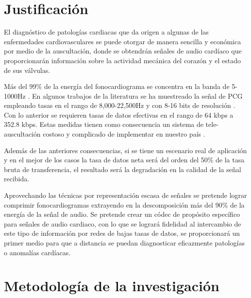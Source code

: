 \section{Justificación}
El diagnóstico de patologías cardiacas que da origen a algunas de las enfermedades cardiovasculares se puede otorgar de manera sencilla y económica por medio de la auscultación, donde se obtendrán señales de audio cardíaco que proporcionarán información sobre la actividad mecánica del corazón y el estado de sus válvulas. 

Más del 99\% de la energía del fonocardiograma se concentra en la banda de 5-1000Hz \cite[]{Djebbari2000}.  
En algunos trabajos de la literatura se ha muestreado la señal de PCG empleando tasas en el rango de 8,000-22,500Hz y con 8-16 bits de resolución \cite[]{castorena2012}. Con lo anterior se requieren tasas de datos efectivas en el rango de 64 kbps a 352.8 kbps. Estas medidas tienen como consecuencia un sistema de tele-auscultación costoso y  complicado de implementar en nuestro país \cite[]{Nieblas2014}. 

Además de las anteriores consecuencias, si se tiene un escenario real de aplicación y en el mejor de los casos la tasa de datos neta será del orden del 50\% de la tasa bruta de transferencia, el resultado será la degradación en la calidad de la señal recibida.

Aprovechando las técnicas por representación escasa de señales se pretende lograr comprimir fonocardiogramas extrayendo en la descomposición más del 90\% de la energía de la señal de audio. Se pretende crear un códec de propósito específico para señales de audio cardiaco, con lo que se logrará fidelidad al intercambio de este tipo de información por redes de bajas tasas de datos, se proporcionará un primer medio para que a distancia se puedan diagnosticar eficazmente patologías o anomalías cardíacas.

\section{Metodología de la investigación}

